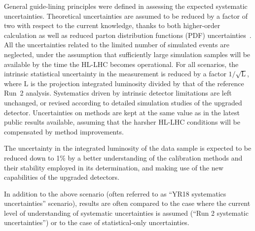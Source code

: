 General guide-lining principles were defined in assessing the expected systematic uncertainties.
Theoretical uncertainties are assumed to be reduced by a factor of two with respect to the current knowledge, thanks to both
higher-order calculation as well as reduced parton distribution functions (PDF) uncertainties~\cite{Khalek:2018mdn}.
All the uncertainties related to the limited number of simulated events are neglected, under the assumption that sufficiently large simulation samples will be available by the time the HL-LHC becomes operational. For all scenarios, the intrinsic statistical uncertainty in the measurement is reduced by a factor $1/\sqrt{\text{L}}$, where $\text{L}$ is the projection integrated luminosity divided by that of the reference Run~2 analysis.
Systematics driven by intrinsic detector limitations are left unchanged, or revised according to detailed simulation studies of the upgraded detector.
Uncertainties on methods are kept at the same value as in the latest public results available, assuming that the harsher HL-LHC conditions will be compensated by method improvements.


The uncertainty in the integrated luminosity of the data sample is expected to be reduced down to 1\% by a better understanding of the calibration methods and
their stability employed in its determination, and making use of the new capabilities of the upgraded detectors.

In addition to the above scenario (often referred to as ``YR18 systematics uncertainties'' scenario), results are often
compared to the case where the current level of understanding of systematic uncertainties is assumed (``Run 2 systematic uncertainties'')
or to the case of statistical-only uncertainties.





